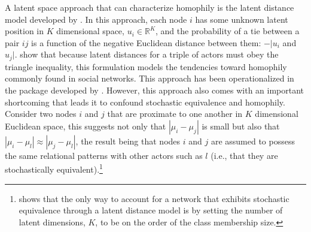 A latent space approach that can characterize homophily is the latent distance model developed by \citet{hoff:etal:2002}. In this approach, each node $i$ has some unknown latent position in $K$ dimensional space, $u_{i} \in \mathbb{R}^{K}$, and the probability of a tie between a pair $ij$ is a function of the negative Euclidean distance between them: $-|u_{i}$ and $u_{j}|$. \citet{hoff:etal:2002} show that because latent distances for a triple of actors must obey the triangle inequality, this formulation models the tendencies toward homophily commonly found in social networks. This approach has been operationalized in the  package developed by \citet{krivitsky:handcock:2015}. However, this approach also comes with an important shortcoming that leads it to confound stochastic equivalence and homophily. Consider two nodes $i$ and $j$ that are proximate to one another in $K$ dimensional Euclidean space, this suggests not only that $|\mu_{i} - \mu_{j}|$ is small but also that $|\mu_{i} - \mu_{l}| \approx |\mu_{j} - \mu_{l}|$, the result being that nodes $i$ and $j$ are assumed to possess the same relational patterns with other actors such as $l$ (i.e., that they are stochastically equivalent).\footnote{\citet{hoff:2008} shows that the only way to account for a network that exhibits stochastic equivalence through a latent distance model is by setting the number of latent dimensions, $K$, to be on the order of the class membership size.} 


